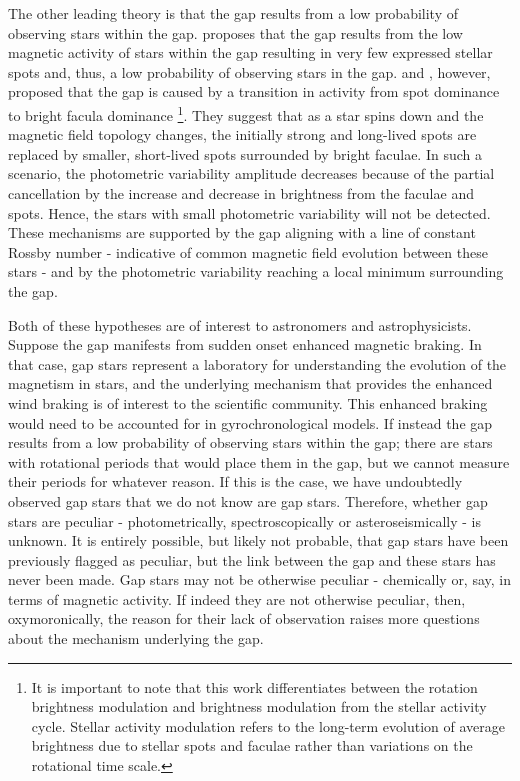 The other leading theory is that the gap results from a low probability of observing stars within the gap.
\citet{chahal_statistics_2022} proposes that the gap results from the low magnetic activity of stars within the gap resulting in very few expressed stellar spots and, thus, a low probability of observing stars in the gap.
\citet{reinhold_transition_2019} and \citet{reinhold_stellar_2020}, however, proposed that the gap is caused by a transition in activity from spot dominance to bright facula dominance \footnote{It is important to note that this work differentiates between the rotation brightness modulation and brightness modulation from the stellar activity cycle. Stellar activity modulation refers to the long-term evolution of average brightness due to stellar spots and faculae rather than variations on the rotational time scale.}.
They suggest that as a star spins down and the magnetic field topology changes, the initially strong and long-lived spots are replaced by smaller, short-lived spots surrounded by bright faculae.
In such a scenario, the photometric variability amplitude decreases because of the partial cancellation by the increase and decrease in brightness from the faculae and spots.
Hence, the stars with small photometric variability will not be detected.
These mechanisms are supported by the gap aligning with a line of constant Rossby number - indicative of common magnetic field evolution between these stars - and by the photometric variability reaching a local minimum surrounding the gap.

Both of these hypotheses are of interest to astronomers and astrophysicists.
Suppose the gap manifests from sudden onset enhanced magnetic braking. 
In that case, gap stars represent a laboratory for understanding the evolution of the magnetism in stars, and the underlying mechanism that provides the enhanced wind braking is of interest to the scientific community. 
This enhanced braking would need to be accounted for in gyrochronological models.
If instead the gap results from a low probability of observing stars within the gap; there are stars with rotational periods that would place them in the gap, but we cannot measure their periods for whatever reason.
If this is the case, we have undoubtedly observed gap stars that we do not know are gap stars.
Therefore, whether gap stars are peculiar - photometrically, spectroscopically or asteroseismically - is unknown.
It is entirely possible, but likely not probable, that gap stars have been previously flagged as peculiar, but the link between the gap and these stars has never been made.
Gap stars may not be otherwise peculiar - chemically or, say, in terms of magnetic activity.
If indeed they are not otherwise peculiar, then, oxymoronically, the reason for their lack of observation raises more questions about the mechanism underlying the gap.

